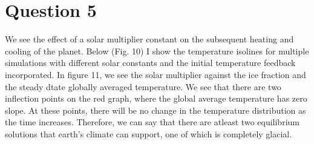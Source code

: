 \documentclass{article}
\begin{document}
\section*{Question 5}
We see the effect of a solar multiplier constant on the subsequent heating and cooling of the planet. Below (Fig. 10) I show the temperature isolines for multiple simulations with different solar constants and the initial temperature feedback incorporated. In figure 11, we see the solar multiplier against the ice fraction and the steady dtate globally averaged temperature. We see that there are two inflection points on the red graph, where the global average temperature has zero slope. At these points, there will be no change in the temperature distribution as the time increases. Therefore, we can say that there are atleast two equilibrium solutions that earth's climate can support, one of which is completely glacial.  
\end{document}
